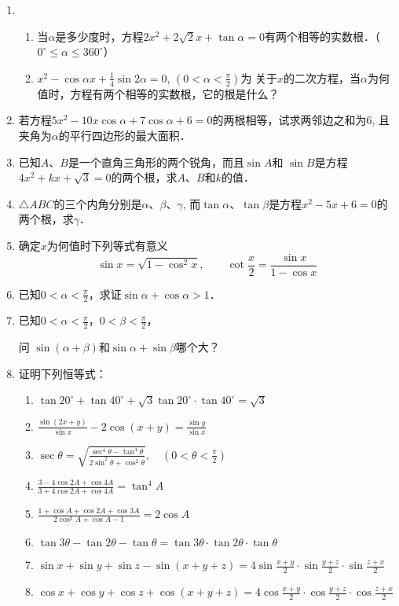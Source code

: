 \begin{enumerate}
\item \begin{enumerate}
    \item 当$\alpha$是多少度时，方程$2x^2+2\sqrt{2}x+\tan \alpha=0$有两个相等的实数根．（$0^{\circ}\le \alpha\le 360^{\circ}$）
    \item $x^2-\cos\alpha x+\frac{1}{4}\sin2\alpha=0$, $\left(0<\alpha<\frac{\pi}{2}\right)$为
关于$x$的二次方程，当$\alpha$为何值时，方程有两个相等的实数根，它的根是什么？
\end{enumerate}
\item 若方程$5x^2-10x\cos \alpha+7\cos\alpha+6=0$的两根相等，试求两邻边之和为6, 且夹角为$\alpha$的平行四边形的最大面积．
\item 已知$A$、$B$是一个直角三角形的两个锐角，而且$\sin A$和
$\sin B$是方程$4x^2+kx+\sqrt{3}=0$的两个根，求$A$、$B$和$k$的值．
\item $\triangle ABC$的三个内角分别是$\alpha$、$\beta$、$\gamma$, 而$\tan \alpha$、$\tan \beta$是方程$x^2-5x+6=0$的两个根，求$\gamma$．
\item 确定$x$为何值时下列等式有意义
\[\sin x=\sqrt{1-\cos^2x},\qquad \cot\frac{x}{2}=\frac{\sin x}{1-\cos x}\]
\item 已知$0<\alpha<\frac{\pi}{2}$，求证$\sin\alpha+\cos\alpha>1$．
\item 已知$0<\alpha<\frac{\pi}{2}$，$0<\beta<\frac{\pi}{2}$，

问 $\sin(\alpha+\beta)$和$\sin\alpha+\sin\beta$哪个大？
\item 证明下列恒等式：
\begin{enumerate}
    \item $\tan 20^{\circ}+\tan 40^{\circ}+\sqrt{3}\tan 20^{\circ}\cdot \tan 40^{\circ}=\sqrt{3}$
    \item $\frac{\sin (2 x+y)}{\sin x}-2 \cos (x+y)=\frac{\sin y}{\sin x}$
    \item $\sec \theta=\sqrt{\frac{\sec ^{4} \theta-\tan ^{4}\theta}{2 \sin ^{2} \theta+\cos ^{2} \theta}}, \quad\left(0<\theta<\frac{\pi}{2}\right)$
    \item $\frac{3-4 \cos 2 A+\cos 4 A}{3+4 \cos 2 A+\cos 4 A}=\tan ^{4} A$
    \item $\frac{1+\cos A+\cos 2 A+\cos 3 A}{2 \cos ^{2} A+\cos A-1}=2 \cos A$
    \item $\tan  3 \theta-\tan  2 \theta-\tan  \theta=\tan  3 \theta \cdot \tan  2 \theta \cdot \tan  \theta$
    \item $\sin x+\sin y+\sin z-\sin (x+y+z)=4 \sin \frac{x+y}{2} \cdot \sin \frac{y+z}{2} \cdot \sin \frac{z+x}{2}$
    \item $\cos x+\cos y+\cos z+\cos (x+y+z)=4 \cos \frac{x+y}{2} \cdot \cos \frac{y+z}{2} \cdot \cos \frac{z+x}{2}$
\end{enumerate}



\end{enumerate}
